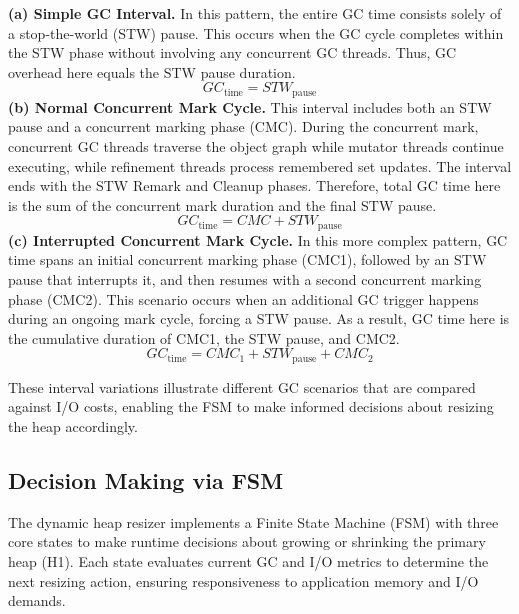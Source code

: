 \textbf{(a) Simple GC Interval.} In this pattern, the entire GC time consists solely of a stop-the-world (STW) pause. This occurs when the GC cycle completes within the STW phase without involving any concurrent GC threads. Thus, GC overhead here equals the STW pause duration. 
\begin{equation}
GC_{\text{time}} = STW_{\text{pause}}
\end{equation}
\textbf{(b) Normal Concurrent Mark Cycle.} This interval includes both an STW pause and a concurrent marking phase (CMC). During the concurrent mark, concurrent GC threads traverse the object graph while mutator threads continue executing, while refinement threads process remembered set updates. The interval ends with the STW Remark and Cleanup phases. Therefore, total GC time here is the sum of the concurrent mark duration and the final STW pause.
\begin{equation}
GC_{\text{time}} = CMC + STW_{\text{pause}}
\end{equation}
\textbf{(c) Interrupted Concurrent Mark Cycle.} In this more complex pattern, GC time spans an initial concurrent marking phase (CMC1), followed by an STW pause that interrupts it, and then resumes with a second concurrent marking phase (CMC2). This scenario occurs when an additional GC trigger happens during an ongoing mark cycle, forcing a STW pause. As a result, GC time here is the cumulative duration of CMC1, the STW pause, and CMC2.
\begin{equation}
  GC_{\text{time}} = CMC_{\text{1}} + STW_{\text{pause}} + CMC_{\text{2}}
\end{equation}

These interval variations illustrate different GC scenarios that are compared against I/O costs, enabling the FSM to make informed decisions about resizing the heap accordingly.

\subsection{Decision Making via FSM}

The dynamic heap resizer implements a Finite State Machine (FSM) with three core states to make runtime decisions about growing or shrinking the primary heap (H1). Each state evaluates current GC and I/O metrics to determine the next resizing action, ensuring responsiveness to application memory and I/O demands.

